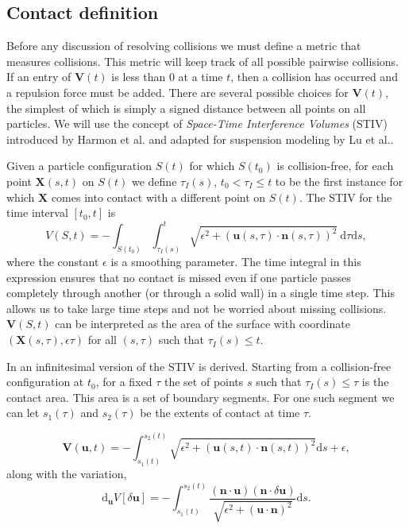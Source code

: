 \documentclass[preprint, 10pt]{elsarticle}
\begin{document}
\subsection{Contact definition}

Before any discussion of resolving collisions we must define a metric that measures collisions. This metric will keep track of all possible pairwise collisions. If an entry of $\mathbf{V}(t)$ is less than 0 at a time $t$, then a collision has occurred and a repulsion force must be added. There are several possible choices for $\mathbf{V}(t)$, the simplest of which is simply a signed distance between all points on all particles. We will use the concept of \textit{Space-Time Interference Volumes} (STIV) introduced by Harmon et al.\cite{Harmon2011} and adapted for suspension modeling by Lu et al.\cite{Lu2017}. 

Given a particle configuration $S(t)$ for which $S(t_0)$ is collision-free, for each point $\mathbf{X}(s,t)$ on $S(t)$ we define $\tau_I(s)$, $t_0 < \tau_I \leq t$ to be the first instance for which $\mathbf{X}$ comes into contact with a different point on $S(t)$. The STIV for the time interval $[t_0, t]$ is 
\[ V(S, t) = -\int_{S(t_0)}\int_{\tau_I(s)}^t \sqrt{\epsilon^2 + (\mathbf{u}(s, \tau)\cdot\mathbf{n}(s,\tau))^2}~\text{d}\tau\text{d}s,\]
where the constant $\epsilon$ is a smoothing parameter. The time integral in this expression ensures that no contact is missed even if one particle passes completely through another (or through a solid wall) in a single time step. This allows us to take large time steps and not be worried about missing collisions. $\mathbf{V}(S,t)$ can be interpreted as the area of the surface with coordinate $(\mathbf{X}(s,\tau),\epsilon\tau)$ for all $(s,\tau)$ such that $\tau_I(s)\leq t$. 

In \cite{Lu2017} an infinitesimal version of the STIV is derived. Starting from a collision-free configuration at $t_0$, for a fixed $\tau$ the set of points $s$ such that $\tau_I(s)\leq \tau$ is the contact area. This area is a set of boundary segments. For one such segment we can let $s_1(\tau)$ and $s_2(\tau)$ be the extents of contact at time $\tau$. 

\[ \mathbf{V}(\mathbf{u},t) = -\int_{s_1(t)}^{s_2(t)} \sqrt{\epsilon^2 + (\mathbf{u}(s,t)\cdot\mathbf{n}(s,t))^2}\text{d}s + \epsilon,\]
along with the variation, 
\[ \text{d}_{\mathbf{u}}V[\delta\mathbf{u}] = -\int_{s_1(t)}^{s_2(t)}\frac{(\mathbf{n}\cdot\mathbf{u})(\mathbf{n}\cdot\delta\mathbf{u})}{\sqrt{\epsilon^2 + (\mathbf{u}\cdot\mathbf{n})^2}}\text{d}s.\]
\end{document}
